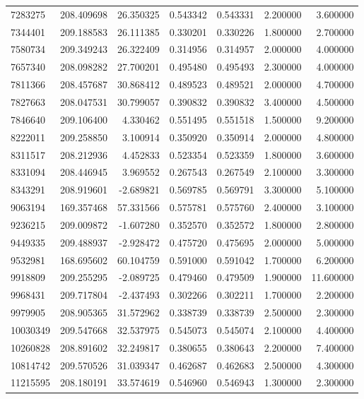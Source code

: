 \begin{tabular}{lrrrrrr}
7283275 & 208.409698 & 26.350325 & 0.543342 & 0.543331 & 2.200000 & 3.600000 \\
7344401 & 209.188583 & 26.111385 & 0.330201 & 0.330226 & 1.800000 & 2.700000 \\
7580734 & 209.349243 & 26.322409 & 0.314956 & 0.314957 & 2.000000 & 4.000000 \\
7657340 & 208.098282 & 27.700201 & 0.495480 & 0.495493 & 2.300000 & 4.000000 \\
7811366 & 208.457687 & 30.868412 & 0.489523 & 0.489521 & 2.000000 & 4.700000 \\
7827663 & 208.047531 & 30.799057 & 0.390832 & 0.390832 & 3.400000 & 4.500000 \\
7846640 & 209.106400 & 4.330462 & 0.551495 & 0.551518 & 1.500000 & 9.200000 \\
8222011 & 209.258850 & 3.100914 & 0.350920 & 0.350914 & 2.000000 & 4.800000 \\
8311517 & 208.212936 & 4.452833 & 0.523354 & 0.523359 & 1.800000 & 3.600000 \\
8331094 & 208.446945 & 3.969552 & 0.267543 & 0.267549 & 2.100000 & 3.300000 \\
8343291 & 208.919601 & -2.689821 & 0.569785 & 0.569791 & 3.300000 & 5.100000 \\
9063194 & 169.357468 & 57.331566 & 0.575781 & 0.575760 & 2.400000 & 3.100000 \\
9236215 & 209.009872 & -1.607280 & 0.352570 & 0.352572 & 1.800000 & 2.800000 \\
9449335 & 209.488937 & -2.928472 & 0.475720 & 0.475695 & 2.000000 & 5.000000 \\
9532981 & 168.695602 & 60.104759 & 0.591000 & 0.591042 & 1.700000 & 6.200000 \\
9918809 & 209.255295 & -2.089725 & 0.479460 & 0.479509 & 1.900000 & 11.600000 \\
9968431 & 209.717804 & -2.437493 & 0.302266 & 0.302211 & 1.700000 & 2.200000 \\
9979905 & 208.905365 & 31.572962 & 0.338739 & 0.338739 & 2.500000 & 2.300000 \\
10030349 & 209.547668 & 32.537975 & 0.545073 & 0.545074 & 2.100000 & 4.400000 \\
10260828 & 208.891602 & 32.249817 & 0.380655 & 0.380643 & 2.200000 & 7.400000 \\
10814742 & 209.570526 & 31.039347 & 0.462687 & 0.462683 & 2.500000 & 4.300000 \\
11215595 & 208.180191 & 33.574619 & 0.546960 & 0.546943 & 1.300000 & 2.300000 \\

\end{tabular}
